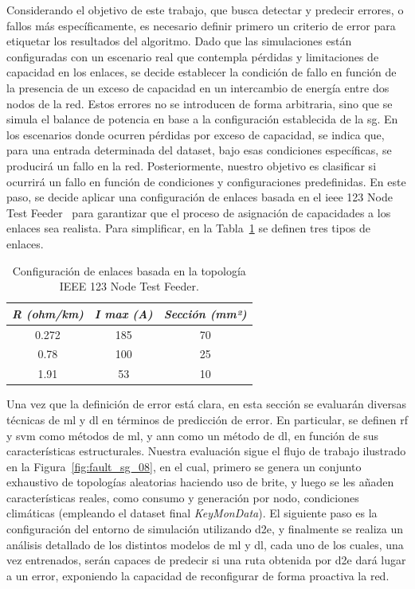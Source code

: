 Considerando el objetivo de este trabajo, que busca detectar y predecir errores, o fallos más específicamente, es necesario definir primero un criterio de error para etiquetar los resultados del algoritmo. Dado que las simulaciones están configuradas con un escenario real que contempla pérdidas y limitaciones de capacidad en los enlaces, se decide establecer la condición de fallo en función de la presencia de un exceso de capacidad en un intercambio de energía entre dos nodos de la red. Estos errores no se introducen de forma arbitraria, sino que se simula el balance de potencia en base a la configuración establecida de la \gls{sg}. En los escenarios donde ocurren pérdidas por exceso de capacidad, se indica que, para una entrada determinada del dataset, bajo esas condiciones específicas, se producirá un fallo en la red. Posteriormente, nuestro objetivo es clasificar si ocurrirá un fallo en función de condiciones y configuraciones predefinidas. En este paso, se decide aplicar una configuración de enlaces basada en el \gls{ieee} 123 Node Test Feeder~\cite{Schneider17} para garantizar que el proceso de asignación de capacidades a los enlaces sea realista. Para simplificar, en la Tabla~\ref{tab:links} se definen tres tipos de enlaces.


\begin{table}[h!]
    \centering
    \begin{tabular}{|c|c|c|}
    \hline
    \multicolumn{1}{|c|}{\textit{R (ohm/km)}} & \multicolumn{1}{c|}{\textit{I max (A)}} & \textit{Sección (mm²)} \\ \hline
    0.272 & 185 & 70 \\ \hline
    0.78 & 100 & 25 \\ \hline
    1.91 & 53 & 10 \\ \hline
    \end{tabular}
    \caption{Configuración de enlaces basada en la topología IEEE 123 Node Test Feeder.}
    \label{tab:links}
\end{table}

Una vez que la definición de error está clara, en esta sección se evaluarán diversas técnicas de \gls{ml} y \gls{dl} en términos de predicción de error. En particular, se definen \gls{rf} y \gls{svm} como métodos de \gls{ml}, y \gls{ann} como un método de \gls{dl}, en función de sus características estructurales. Nuestra evaluación sigue el flujo de trabajo ilustrado en la Figura~\ref{fig:fault_sg_08}, en el cual, primero se genera un conjunto exhaustivo de topologías aleatorias haciendo uso de \gls{brite}, y luego se les añaden características reales, como consumo y generación por nodo, condiciones climáticas (empleando el dataset final \textit{KeyMonData}). El siguiente paso es la configuración del entorno de simulación utilizando \gls{d2e}, y finalmente se realiza un análisis detallado de los distintos modelos de \gls{ml} y \gls{dl}, cada uno de los cuales, una vez entrenados, serán capaces de predecir si una ruta obtenida por \gls{d2e} dará lugar a un error, exponiendo la capacidad de reconfigurar de forma proactiva la red.


